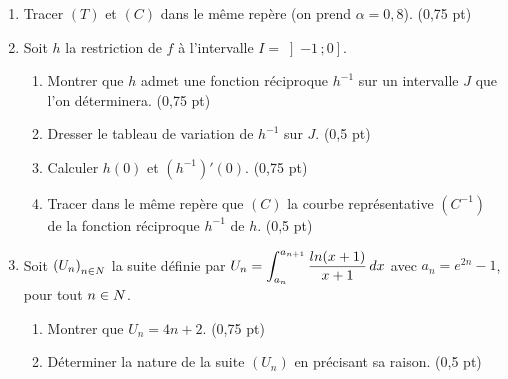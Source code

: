 \begin{commeaubac}
\begin{enumerate}[label=\textbf{\arabic*.}, leftmargin=*, itemsep=0.3em]
\begin{enumerate}[label=\textbf{\alph*)}, leftmargin=1.4em]
                \hfill\textup{(0,5 pt)}
          \item Écrire l'équation de la tangente $(T)$ à $(C)$ au point
                d'abscisse $x_{0} = 0$. \hfill\textup{(0,5 pt)}
        \end{enumerate}
  \item Tracer $(T)$ et $(C)$ dans le même repère (on prend
        $\alpha = 0{,}8$). \hfill\textup{(0,75 pt)}
  \item Soit $h$ la restriction de $f$ à l'intervalle $I = \left]-1\,;0\right]$.
        \begin{enumerate}[label=\textbf{\alph*)}, leftmargin=1.4em]
          \item Montrer que $h$ admet une fonction réciproque $h^{-1}$ sur un
                intervalle $J$ que l'on déterminera. \hfill\textup{(0,75 pt)}
          \item Dresser le tableau de variation de $h^{-1}$ sur $J$.
                \hfill\textup{(0,5 pt)}
          \item Calculer $h(0)$ et $\left(h^{-1}\right)'(0)$.
                \hfill\textup{(0,75 pt)}
          \item Tracer dans le même repère que $(C)$ la courbe représentative
                $(C^{-1})$ de la fonction réciproque $h^{-1}$ de $h$.
                \hfill\textup{(0,5 pt)}
        \end{enumerate}
  \item Soit $\left(U_{n}\right)_{n\in N}$ la suite définie par
        $U_{n} = \displaystyle\int_{a_{n}}^{a_{n+1}}\dfrac{ln(x+1)}{x+1}\,dx$
        avec $a_{n} = e^{2n}-1$, pour tout $n\in N$.
        \begin{enumerate}[label=\textbf{\alph*)}, leftmargin=1.4em]
          \item Montrer que $U_{n} = 4n+2$. \hfill\textup{(0,75 pt)}
          \item Déterminer la nature de la suite $\left(U_{n}\right)$ en
                précisant sa raison. \hfill\textup{(0,5 pt)}
        \end{enumerate}
\end{enumerate}
\end{commeaubac}

